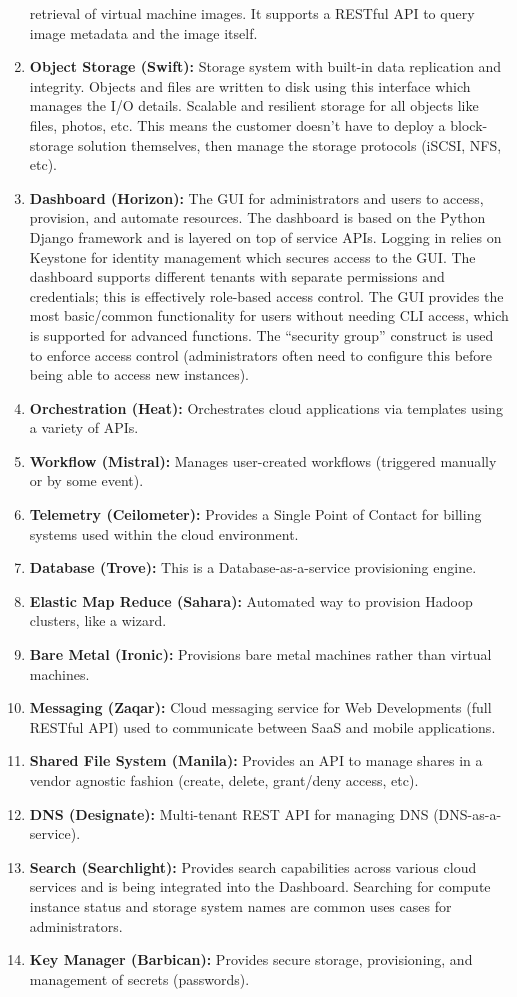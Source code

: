 \begin{enumerate}
  retrieval of virtual machine images. It supports a RESTful API to query
  image metadata and the image itself.
  \item	\textbf{Object Storage (Swift):} Storage system with built-in data
  replication and integrity. Objects and files are written to disk using this
  interface which manages the I/O details. Scalable and resilient storage for
  all objects like files, photos, etc. This means the customer doesn’t have to
  deploy a block-storage solution themselves, then manage the storage
  protocols (iSCSI, NFS, etc).
  \item	\textbf{Dashboard (Horizon):} The GUI for administrators and users to
  access, provision, and automate resources. The dashboard is based on the
  Python Django framework and is layered on top of service APIs. Logging in
  relies on Keystone for identity management which secures access to the GUI\@.
  The dashboard supports different tenants with separate permissions and
  credentials; this is effectively role-based access control. The GUI provides
  the most basic/common functionality for users without needing CLI access,
  which is supported for advanced functions. The ``security group'' construct
  is used to enforce access control (administrators often need to configure
  this before being able to access new instances).
  \item	\textbf{Orchestration (Heat):} Orchestrates cloud applications via
  templates using a variety of APIs.
  \item	\textbf{Workflow (Mistral):} Manages user-created workflows (triggered
  manually or by some event).
  \item	\textbf{Telemetry (Ceilometer):} Provides a Single Point of Contact
  for billing systems used within the cloud environment.
  \item	\textbf{Database (Trove):} This is a Database-as-a-service
  provisioning engine.
  \item	\textbf{Elastic Map Reduce (Sahara):} Automated way to provision
  Hadoop clusters, like a wizard.
  \item	\textbf{Bare Metal (Ironic):} Provisions bare metal machines rather
  than virtual machines.
  \item	\textbf{Messaging (Zaqar):} Cloud messaging service for Web
  Developments (full RESTful API) used to communicate between SaaS and mobile applications.
  \item	\textbf{Shared File System (Manila):} Provides an API to manage shares
  in a vendor agnostic fashion (create, delete, grant/deny access, etc).
  \item	\textbf{DNS (Designate):} Multi-tenant REST API for managing DNS
  (DNS-as-a-service).
  \item	\textbf{Search (Searchlight):} Provides search capabilities across
  various cloud services and is being integrated into the Dashboard. Searching
  for compute instance status and storage system names are common uses cases
  for administrators.
  \item	\textbf{Key Manager (Barbican):} Provides secure storage,
  provisioning, and management of secrets (passwords).
\end{enumerate}

